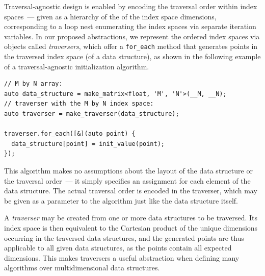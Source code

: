 
Traversal-agnostic design is enabled by encoding the traversal order within index spaces~--- given as a hierarchy of the  of the index space dimensions, corresponding to a loop nest enumerating the index spaces via separate iteration variables. In our proposed abstractions, we represent the ordered index spaces via objects called \emph{traversers}, which offer a \lstinline{for_each} method that generates points in the traversed index space (of a data structure), as shown in the following example of a traversal-agnostic initialization algorithm.

\begin{lstlisting}[style=C++, caption={A traversal-agnostic initialization algorithm}, label={lst:traversal-agnostic-initialization}]
// M by N array:
auto data_structure = make_matrix<float, 'M', 'N'>(__M, __N);
// traverser with the M by N index space:
auto traverser = make_traverser(data_structure);

traverser.for_each([&](auto point) {
  data_structure[point] = init_value(point);
});
\end{lstlisting}

This algorithm makes no assumptions about the layout of the data structure or the traversal order~--- it simply specifies an assignment for each element of the data structure. The actual traversal order is encoded in the traverser, which may be given as a parameter to the algorithm just like the data structure itself.

A \emph{traverser} may be created from one or more data structures to be traversed. Its index space is then equivalent to the Cartesian product of the unique dimensions occurring in the traversed data structures, and the generated points are thus applicable to all given data structures, as the points contain all expected dimensions. This makes traversers a useful abstraction when defining many algorithms over multidimensional data structures.


